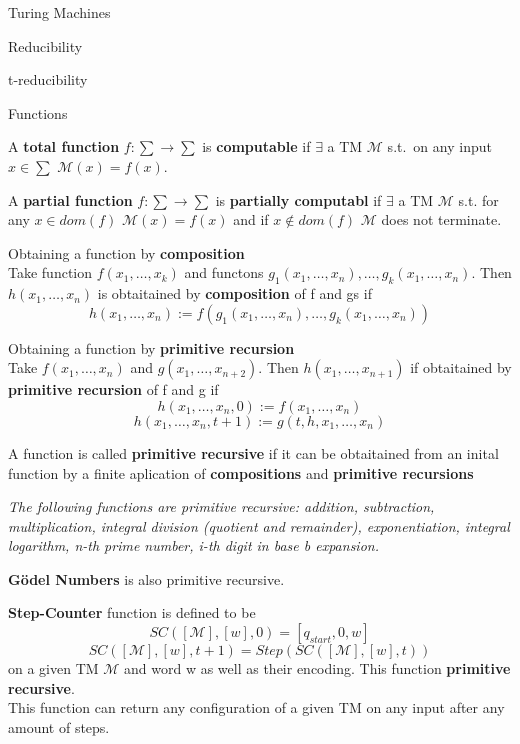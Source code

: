 \documentclass[12pt, letterpaper]{article}
\begin{document}
\begin{section}{Turing Machines}
\begin{subsection}{Reducibility}
\begin{subsubsection}{t-reducibility}
    \end{subsubsection}

  \end{subsection}

  \begin{subsection}{Functions}

    A \textbf{total function} \(f: \sum \rightarrow \sum\) is \textbf{computable} if
    \(\exists\) a TM \(\mathscr{M}\) s.t.\ on any input \(x \in \sum\)
    \(\mathscr{M}(x) = f(x)\).

    A \textbf{partial function} \(f: \sum \rightarrow \sum\) is
    \textbf{partially computabl} if \(\exists\) a TM \(\mathscr{M}\) s.t.
    for any \(x \in dom(f)\) \(\mathscr{M}(x) = f(x)\) and if \(x \notin dom(f)\)
    \(\mathscr{M}\) does not terminate.

    Obtaining a function by \textbf{composition} \\
    Take function \(f(x_{1}, \dots, x_{k})\) and functons
    \(g_{1}(x_{1}, \dots, x_{n}), \dots, g_{k}(x_{1}, \dots, x_{n})\).
    Then \(h(x_{1}, \dots, x_{n})\) is obtaitained by \textbf{composition}
    of f and gs if
    \[h(x_{1}, \dots, x_{n}) := f(g_{1}(x_{1}, \dots, x_{n}), \dots, g_{k}(x_{1}, \dots, x_{n}))\]

    Obtaining a function by \textbf{primitive recursion} \\
    Take \(f(x_{1}, \dots, x_{n})\) and \(g(x_{1}, \dots, x_{n+2})\). Then
    \(h(x_{1}, \dots, x_{n + 1})\) if obtaitained by \textbf{primitive recursion}
    of f and g if
    \[h(x_{1}, \dots, x_{n}, 0) := f(x_{1}, \dots, x_{n})\]
    \[h(x_{1}, \dots, x_{n}, t + 1) := g(t, h, x_{1}, \dots, x_{n})\]

    A function is called \textbf{primitive recursive} if it can be obtaitained
    from an inital function by a finite aplication of
    \textbf{compositions} and \textbf{primitive recursions}

    \textit{The following functions are primitive recursive:
      addition, subtraction, multiplication, integral division
      (quotient and remainder), exponentiation, integral logarithm,
      n-th prime number, i-th digit in base b expansion.}

    \textbf{Gödel Numbers} is also primitive recursive.

    \textbf{Step-Counter} function is defined to be
    \[SC([\mathscr{M}], [w], 0) = [q_{start}, 0, w]\]
    \[SC([\mathscr{M}], [w], t + 1) = Step(SC([\mathscr{M}], [w], t))\]
    on a given TM \(\mathscr{M}\) and word w as well as their encoding.
    This function \textbf{primitive recursive}. \\
    This function can return any configuration of a given TM on any input
    after any amount of steps.

  \end{subsection}

\end{section}
\end{document}
